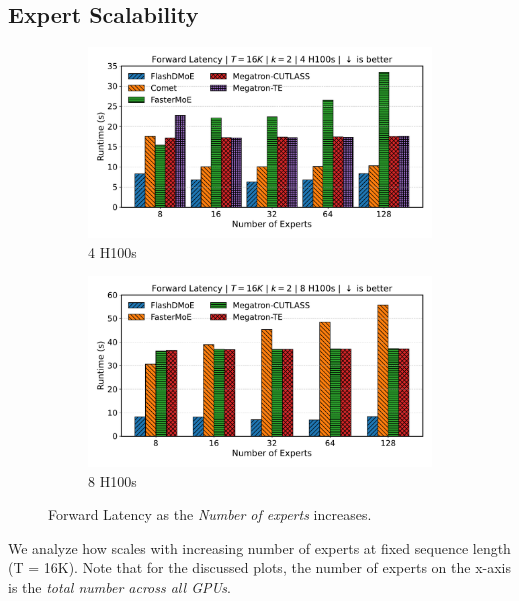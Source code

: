 \subsection{Expert Scalability}\label{subsec:expert-scalability}
\begin{figure}[!h]
    \centering
    \begin{subfigure}{0.49\textwidth}
        \centering
        \includegraphics[width=\linewidth, keepaspectratio]{figures/scaling_experts}
        \caption{4 H100s}
        \label{sub:4gx}
    \end{subfigure}
    \begin{subfigure}{0.49\textwidth}
        \centering
        \includegraphics[width=\linewidth, keepaspectratio]{figures/scaling_experts_8}
        \caption{8 H100s}
        \label{sub:8gx}
    \end{subfigure}
    \caption{Forward Latency as the \emph{Number of experts} increases.}
    \label{fig:xs}
\end{figure}
We analyze how \sysname scales with increasing number of experts at fixed sequence length (T = 16K).
Note that for the discussed plots, the number of experts on the x-axis is the \emph{total number across all GPUs}.
